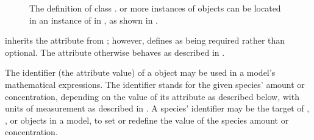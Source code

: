 \begin{figure}[htb]
  \vspace*{-1ex}
  \centering
  \small
  \vspace*{-1ex}
  \caption{The definition of class \Species.   or more
    instances of \Species objects can be located in an instance of
    \ListOfSpecies in \Model, as shown in
    \protect{}.}
  \label{fig:species}
\end{figure}



\begin{blockChanged}
\Species inherits the  attribute from \SBase; however, \Species defines  as being required rather than optional.  The attribute otherwise behaves as described in .

The identifier (the  attribute value) of a \Species object may be used in a model's mathematical expressions.  The identifier stands for the given species' amount or concentration, depending on the value of its  attribute as described below, with units of measurement as described in .  A species' identifier may be the target of \InitialAssignment, \EventAssignment, or \Rule objects in a model, to set or redefine the value of the species amount or concentration.
\end{blockChanged}


